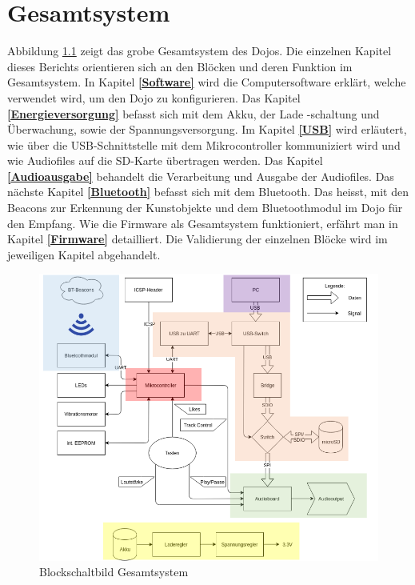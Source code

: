 \chapter{Gesamtsystem}
\thispagestyle{fancy} 

Abbildung \ref{Blockschaltbild_Gesamtsystem} zeigt das grobe Gesamtsystem des Dojos. Die einzelnen Kapitel dieses Berichts orientieren sich an den Blöcken und deren Funktion im Gesamtsystem. In Kapitel \textbf{\ref{Software} } wird die Computersoftware erklärt, welche verwendet wird, um den Dojo zu konfigurieren. Das Kapitel \textbf{\ref{Energieversorgung} } befasst sich mit dem Akku, der Lade -schaltung und Überwachung, sowie der Spannungsversorgung. Im Kapitel \textbf{\ref{USB} } wird erläutert, wie über die USB-Schnittstelle mit dem Mikrocontroller kommuniziert wird und wie Audiofiles auf die SD-Karte übertragen werden. Das Kapitel \textbf{\ref{Audioausgabe} } behandelt die Verarbeitung und Ausgabe der Audiofiles. Das nächste Kapitel \textbf{\ref{Bluetooth} } befasst sich mit dem Bluetooth. Das heisst, mit den Beacons zur Erkennung der Kunstobjekte und dem Bluetoothmodul im Dojo für den Empfang. Wie die Firmware als Gesamtsystem funktioniert, erfährt man in Kapitel \textbf{\ref{Firmware} } detailliert. Die Validierung der einzelnen Blöcke wird im jeweiligen Kapitel abgehandelt.

\begin{figure}[h]
	\centering
	\includegraphics[width=\textwidth]{Bilder/Gesamtsystem.png}
	\caption{Blockschaltbild Gesamtsystem}
	\label{Blockschaltbild_Gesamtsystem}
\end{figure}
